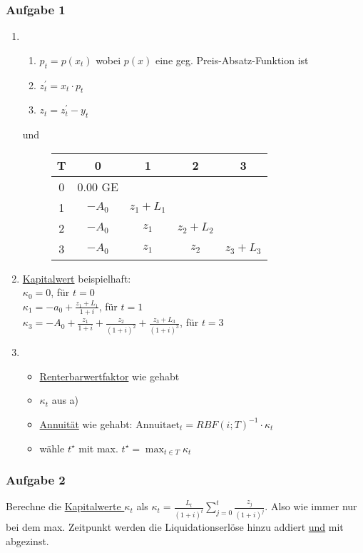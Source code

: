 	\subsubsection*{Aufgabe 1}
	\begin{enumerate}[label=\alph*)]
		\item \begin{enumerate}
				\item $p_t=p(x_t)$ wobei $p(x)$ eine geg. Preis-Absatz-Funktion ist
				\item $z_t^\prime=x_t\cdot p_t$
				\item $z_t=z_t^\prime-y_t$
			\end{enumerate} 
			und \\
			\begin{figure}[H]
				\centering
				\begin{tabular}{|c|c|c|c|c|}
					\hline
					\textbf{T}  & \textbf{0} & \textbf{1} & \textbf{2}  & \textbf{3}\\ \hline
					0          & 0.00 GE     &             &            &   \\
					1          & $-A_0$     & $z_1 + L_1$ &            &  \\			
					2          & $-A_0$     & $z_1$       & $z_2 + L_2$&  \\			
					3          & $-A_0$     & $z_1$       & $z_2$& $z_3+L_3$ \\
					\hline
				\end{tabular}
			\end{figure}
		\item \hyperref[Kapitalwert]{Kapitalwert} beispielhaft:\\
		$\kappa_0=0$, für $t=0$\\
		$\kappa_1=-a_0 + \frac{z_1+L_1}{1+i}$, für $t=1$ \\ $\kappa_3=-A_0+\frac{z_1}{1+i}+\frac{z_2}{(1+i)^2}+\frac{z_3+L_3}{(1+i)^3}$, für $t=3$
		\item \begin{itemize}
				\item \hyperref[Rentenbarwertfaktor]{Renterbarwertfaktor} wie gehabt
				\item $\kappa_t$ aus a)
				\item \hyperref[Annuitaet]{Annuität} wie gehabt: $\text{Annuitaet}_t = RBF(i;T)^{-1}\cdot \kappa_t$
				\item wähle $t^\star$ mit max. $t^\star= \max_{t\in T} \kappa_t$
			\end{itemize}
	\end{enumerate}

	\subsubsection*{Aufgabe 2}
	Berechne die \hyperref[Kapitalwert]{Kapitalwerte $\kappa_t$} als $\kappa_t=\frac{L_t}{(1+i)^t}\sum_{j=0}^t \frac{z_j}{(1+i)^j}$. Also wie immer nur bei dem max. Zeitpunkt werden die Liquidationserlöse hinzu addiert \underline{und} mit abgezinst.
	
	